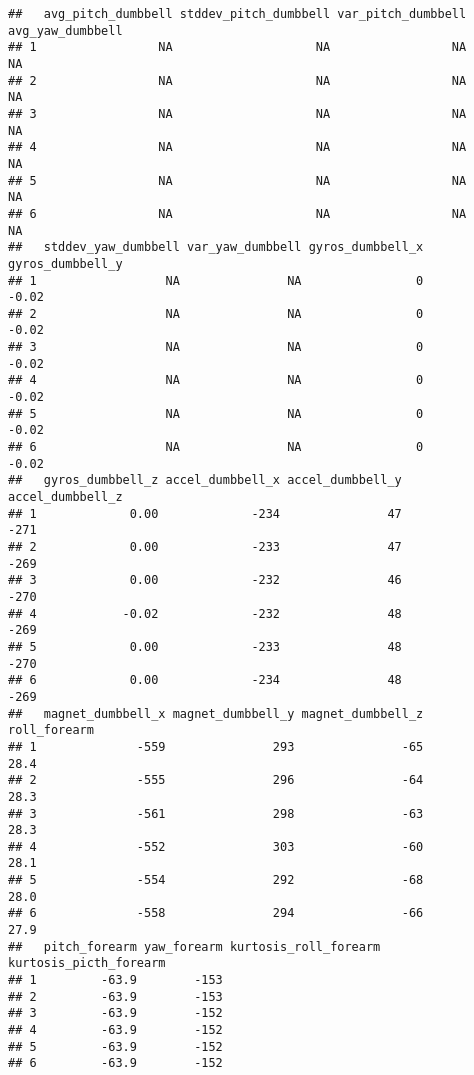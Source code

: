 \documentclass[]{article}
\begin{document}
\begin{verbatim}
##   avg_pitch_dumbbell stddev_pitch_dumbbell var_pitch_dumbbell avg_yaw_dumbbell
## 1                 NA                    NA                 NA               NA
## 2                 NA                    NA                 NA               NA
## 3                 NA                    NA                 NA               NA
## 4                 NA                    NA                 NA               NA
## 5                 NA                    NA                 NA               NA
## 6                 NA                    NA                 NA               NA
##   stddev_yaw_dumbbell var_yaw_dumbbell gyros_dumbbell_x gyros_dumbbell_y
## 1                  NA               NA                0            -0.02
## 2                  NA               NA                0            -0.02
## 3                  NA               NA                0            -0.02
## 4                  NA               NA                0            -0.02
## 5                  NA               NA                0            -0.02
## 6                  NA               NA                0            -0.02
##   gyros_dumbbell_z accel_dumbbell_x accel_dumbbell_y accel_dumbbell_z
## 1             0.00             -234               47             -271
## 2             0.00             -233               47             -269
## 3             0.00             -232               46             -270
## 4            -0.02             -232               48             -269
## 5             0.00             -233               48             -270
## 6             0.00             -234               48             -269
##   magnet_dumbbell_x magnet_dumbbell_y magnet_dumbbell_z roll_forearm
## 1              -559               293               -65         28.4
## 2              -555               296               -64         28.3
## 3              -561               298               -63         28.3
## 4              -552               303               -60         28.1
## 5              -554               292               -68         28.0
## 6              -558               294               -66         27.9
##   pitch_forearm yaw_forearm kurtosis_roll_forearm kurtosis_picth_forearm
## 1         -63.9        -153                                             
## 2         -63.9        -153                                             
## 3         -63.9        -152                                             
## 4         -63.9        -152                                             
## 5         -63.9        -152                                             
## 6         -63.9        -152                                             

\end{verbatim}
\end{document}

